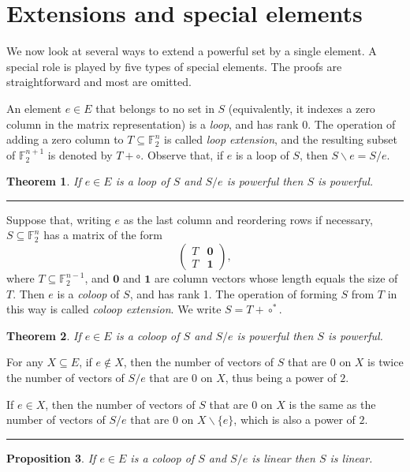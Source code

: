 \documentclass[12pt]{article}
\newtheorem{thm}{Theorem}[section]
\newtheorem{pro}[thm]{Proposition}
\def\pf{\noindent {\it Proof.\ }}
\def\qed{\hfill \rule{4pt}{7pt}}
\begin{document}
\section{Extensions and special elements}
\label{sec:extns-special-elts}

We now look at several ways to extend a powerful set by a single element.
A special role is played by five types of special elements.
The proofs are straightforward and most are omitted.

An element $e\in E$ that belongs to no set in $S$
(equivalently, it indexes a zero column in the matrix representation) is a \textit{loop},
and has rank 0.
The operation of adding a zero column to $T\subseteq\mathbb{F}_2^n$
is called \textit{loop extension}, and the resulting subset of $\mathbb{F}_2^{n+1}$
is denoted by $T+\circ$. Observe that, if $e$ is a loop of $S$,
then $S\backslash e=S/e$.

\begin{thm}\label{thm00}
If $e\in E$ is a loop of $S$ and $S/e$ is powerful then $S$ is powerful.
\qed
\end{thm}

Suppose that, writing $e$ as the last column and reordering rows if necessary,
$S\subseteq\mathbb{F}_2^n$ has a matrix of the form
\[
\left(
\begin{array}{cc}
T & \mathbf{0}   \\
T & \mathbf{1}
\end{array}
\right) ,
\]
where $T\subseteq\mathbb{F}_2^{n-1}$, and $\mathbf{0}$ and $\mathbf{1}$ are column vectors
whose length equals the size of $T$.  Then $e$ is a \textit{coloop} of $S$, and has rank 1.
The operation of forming $S$ from $T$ in this way is called \textit{coloop extension}.
We write $S=T+\circ^*$.

\begin{thm}\label{coloop}
If $e\in E$ is a coloop of $S$ and $S/e$ is powerful then $S$ is powerful.
\end{thm}

\pf For any $X\subseteq E$, if $e\not\in X$, then the number of vectors of $S$ that are 0 on $X$ is twice the number of vectors of $S/e$ that are 0 on $X$, thus being a power of $2$.

If $e\in X$, then the number of vectors of $S$ that are 0 on $X$ is the same as the number of vectors of $S/e$ that are 0 on $X\backslash\{e\}$, which is also a power of $2$.\qed

\begin{pro}
If $e\in E$ is a coloop of $S$ and $S/e$ is linear then $S$ is linear.
\end{pro}
\end{document}
